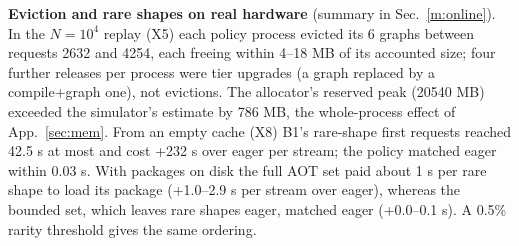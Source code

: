 \documentclass[conference]{IEEEtran}
\newcommand{\tn}[1]{#1}%
\begin{document}
\textbf{Eviction and rare shapes on real hardware} (summary in Sec.~\ref{m:online}). In the $N{=}10^4$ replay (X5) each policy process evicted its \tn{6} graphs between requests \tn{2632} and \tn{4254}, each freeing within \tn{4--18} MB of its accounted size; four further releases per process were tier upgrades (a graph replaced by a compile+graph one), not evictions. The allocator's reserved peak (\tn{20540} MB) exceeded the simulator's estimate by \tn{786} MB, the whole-process effect of App.~\ref{sec:mem}. From an empty cache (X8) B1's rare-shape first requests reached \tn{42.5 s} at most and cost \tn{+232 s} over eager per stream; the policy matched eager within \tn{0.03 s}. With packages on disk the full AOT set paid about \tn{1 s} per rare shape to load its package (\tn{+1.0--2.9 s} per stream over eager), whereas the bounded set, which leaves rare shapes eager, matched eager (\tn{+0.0--0.1 s}). A 0.5\% rarity threshold gives the same ordering.
\end{document}
